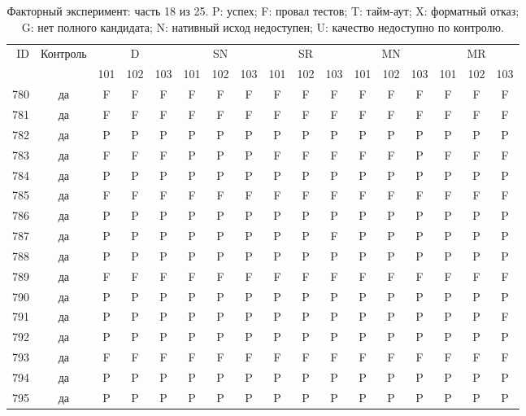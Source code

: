 \begin{table}[p]\centering\footnotesize
\setlength{\tabcolsep}{3pt}
\caption{Факторный эксперимент: часть 18 из 25. P: успех; F: провал тестов; T: тайм-аут; X: форматный отказ; G: нет полного кандидата; N: нативный исход недоступен; U: качество недоступно по контролю.}
\begin{tabular*}{\textwidth}{@{\extracolsep{\fill}}rcccccccccccccccc}\toprule
ID & Контроль & \multicolumn{3}{c}{D} & \multicolumn{3}{c}{SN} & \multicolumn{3}{c}{SR} & \multicolumn{3}{c}{MN} & \multicolumn{3}{c}{MR}\\
\cmidrule(lr){3-5}\cmidrule(lr){6-8}\cmidrule(lr){9-11}\cmidrule(lr){12-14}\cmidrule(lr){15-17}
 & & 101 & 102 & 103 & 101 & 102 & 103 & 101 & 102 & 103 & 101 & 102 & 103 & 101 & 102 & 103\\\midrule
780 & да & F & F & F & F & F & F & F & F & F & F & F & F & F & F & F\\
781 & да & F & F & F & F & F & F & F & F & F & F & F & F & F & F & F\\
782 & да & P & P & P & P & P & P & P & P & P & P & P & P & P & P & P\\
783 & да & F & F & F & P & P & P & F & F & F & F & F & P & F & F & F\\
784 & да & P & P & P & P & P & P & P & P & P & P & P & P & P & P & P\\
785 & да & F & F & F & F & F & F & F & F & F & F & F & F & F & F & F\\
786 & да & P & P & P & P & P & P & P & P & P & P & P & P & P & P & P\\
787 & да & P & P & P & P & P & P & P & P & F & P & P & P & P & P & P\\
788 & да & P & P & P & P & P & P & P & P & P & P & P & P & P & P & P\\
789 & да & F & F & F & F & F & F & F & F & F & F & F & F & F & F & F\\
790 & да & P & P & P & P & P & P & P & P & P & P & P & P & P & P & P\\
791 & да & P & P & P & P & P & P & P & P & P & P & P & P & P & P & F\\
792 & да & P & P & P & P & P & P & P & P & P & P & P & P & P & P & P\\
793 & да & F & F & F & F & F & F & F & F & F & F & F & F & F & F & F\\
794 & да & P & P & P & P & P & P & P & P & P & P & P & P & P & P & P\\
795 & да & P & P & P & P & P & P & P & P & P & P & P & P & P & P & P\\

\end{tabular*}
\end{table}
